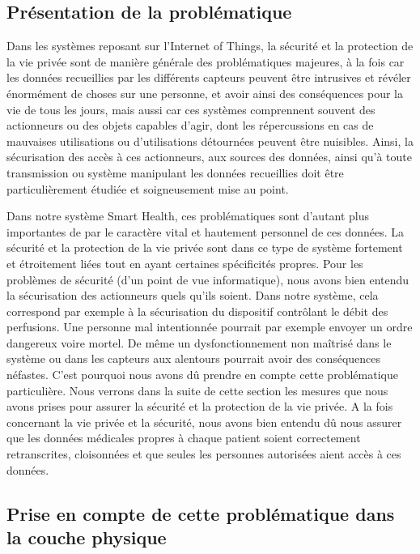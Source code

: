 \subsection{Présentation de la problématique}

Dans les systèmes reposant sur l’Internet of Things, la sécurité et la protection de la vie privée sont de manière générale des problématiques majeures, à la fois car les données recueillies par les différents capteurs peuvent être intrusives et révéler énormément de choses sur une personne, et avoir ainsi des conséquences pour la vie de tous les jours, mais aussi car ces systèmes comprennent souvent des actionneurs ou des objets capables d’agir, dont les répercussions en cas de mauvaises utilisations ou d’utilisations détournées peuvent être nuisibles. Ainsi, la sécurisation des accès à ces actionneurs, aux sources des données, ainsi qu’à toute transmission ou système manipulant les données recueillies doit être particulièrement étudiée et soigneusement mise au point.

Dans notre système Smart Health, ces problématiques sont d’autant plus importantes de par le caractère vital et hautement personnel de ces données. La sécurité et la protection de la vie privée sont dans ce type de système fortement et étroitement liées tout en ayant certaines spécificités propres. Pour les problèmes de sécurité (d’un point de vue informatique), nous avons bien entendu la sécurisation des actionneurs quels qu’ils soient. Dans notre système, cela correspond par exemple à la sécurisation du dispositif contrôlant le débit des perfusions. Une personne mal intentionnée pourrait par exemple envoyer un ordre dangereux voire mortel. De même un dysfonctionnement non maîtrisé dans le système ou dans les capteurs aux alentours pourrait avoir des conséquences néfastes. C’est pourquoi nous avons dû prendre en compte cette problématique particulière. Nous verrons dans la suite de cette section les mesures que nous avons prises pour assurer la sécurité et la protection de la vie privée. A la fois concernant la vie privée et la sécurité, nous avons bien entendu dû nous assurer que les données médicales propres à chaque patient soient correctement retranscrites, cloisonnées et que seules les personnes autorisées aient accès à ces données.

\subsection{Prise en compte de cette problématique dans la couche physique}

